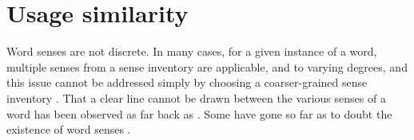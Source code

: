 \documentclass[11pt]{article}
\newcommand{\poscite}[1]{\citeauthor{#1}'s \citeyearpar{#1}}
\begin{document}





\section{Usage similarity}


Word senses are not discrete. In many cases, for a given instance of a
word, multiple senses from a sense inventory are applicable, and to
varying degrees, and this issue cannot be addressed simply by choosing
a coarser-grained sense inventory \citep{Erk2009b}. That a clear line
cannot be drawn between the various senses of a word has been observed
as far back as \cite{Johnson1755}. Some have gone so far as to doubt
the existence of word senses \citep{Kilgarriff1997}.
\end{document}
